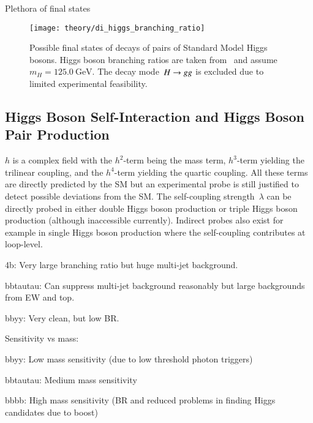 Plethora of final states




\begin{figure}[htbp]
  \centering
  \texttt{[image: theory/di\_higgs\_branching\_ratio]}
  \caption{Possible final states of decays of pairs of Standard Model Higgs
    bosons. Higgs boson branching ratios are taken from~\cite{deFlorian:2016spz}
    and assume~$m_{H} = \SI{125.0}{\GeV}$. The decay mode~$H \rightarrow g g$ is
    excluded due to limited experimental feasibility.}
  \label{fig:hh_branching_ratios}
\end{figure}



\clearpage
{}


\subsection{Higgs Boson Self-Interaction and Higgs Boson Pair Production}




$h$ is a complex field with the $h^2$-term being the mass term,
$h^3$-term yielding the trilinear coupling, and the $h^4$-term
yielding the quartic coupling. All these terms are directly predicted
by the SM but an experimental probe is still justified to detect
possible deviations from the SM. The self-coupling strength~$\lambda$
can be directly probed in either double Higgs boson production or
triple Higgs boson production (although inaccessible
currently). Indirect probes also exist for example in single Higgs
boson production where the self-coupling contributes at loop-level.


4b: Very large branching ratio but huge multi-jet background.

bbtautau: Can suppress multi-jet background reasonably but large
backgrounds from EW and top.

bbyy: Very clean, but low BR.

Sensitivity vs mass:

bbyy: Low mass sensitivity (due to low threshold photon triggers)

bbtautau: Medium mass sensitivity

bbbb: High mass sensitivity (BR and reduced problems in finding Higgs
candidates due to boost)

